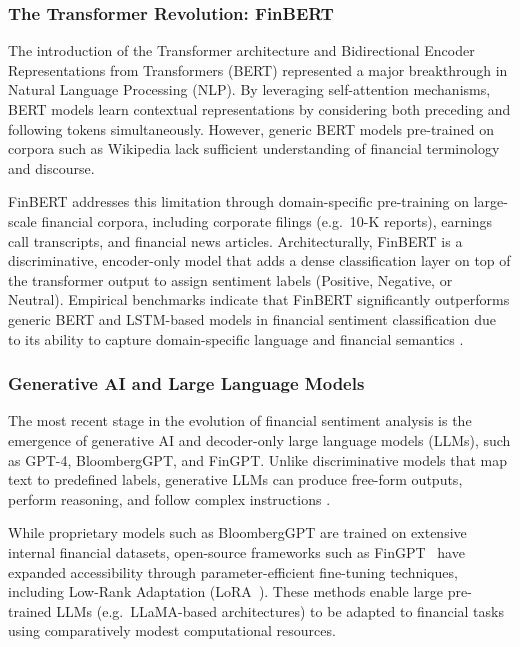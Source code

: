 \documentclass[12pt]{ucetd}
\begin{document}
\subsubsection{The Transformer Revolution: FinBERT}

The introduction of the Transformer architecture \cite{vaswani2017attention} and Bidirectional Encoder Representations from Transformers (BERT) \cite{devlin2019bert} represented a major breakthrough in Natural Language Processing (NLP). By leveraging self-attention mechanisms, BERT models learn contextual representations by considering both preceding and following tokens simultaneously. However, generic BERT models pre-trained on corpora such as Wikipedia lack sufficient understanding of financial terminology and discourse.

FinBERT \cite{araci2019finbert} addresses this limitation through domain-specific pre-training on large-scale financial corpora, including corporate filings (e.g.\ 10-K reports), earnings call transcripts, and financial news articles. Architecturally, FinBERT is a discriminative, encoder-only model that adds a dense classification layer on top of the transformer output to assign sentiment labels (Positive, Negative, or Neutral). Empirical benchmarks indicate that FinBERT significantly outperforms generic BERT and LSTM-based models in financial sentiment classification due to its ability to capture domain-specific language and financial semantics \cite{araci2019finbert, yang2020finbert}.

\subsubsection{Generative AI and Large Language Models}

The most recent stage in the evolution of financial sentiment analysis is the emergence of generative AI and decoder-only large language models (LLMs), such as GPT-4, BloombergGPT, and FinGPT. Unlike discriminative models that map text to predefined labels, generative LLMs can produce free-form outputs, perform reasoning, and follow complex instructions \cite{wu2023bloomberggpt, yang2023fingpt}.

While proprietary models such as BloombergGPT are trained on extensive internal financial datasets, open-source frameworks such as FinGPT~\cite{yang2023fingpt} have expanded accessibility through parameter-efficient fine-tuning techniques, including Low-Rank Adaptation (LoRA~\cite{hu2022lora}). These methods enable large pre-trained LLMs (e.g.\ LLaMA-based architectures) to be adapted to financial tasks using comparatively modest computational resources.
\end{document}
